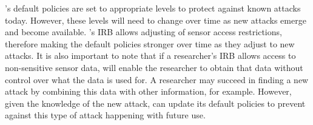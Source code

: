 \sysname's default policies are set to appropriate levels to protect against 
known attacks today. %
However, these levels will need to change over time as
new attacks emerge and become available. \sysname's IRB allows adjusting 
of sensor access restrictions, therefore making the default policies
stronger over time as they adjust to new attacks. It is also important to note that 
if a researcher's IRB allows access to non-sensitive sensor data, \sysname will 
enable the researcher to obtain that data without control over what the data is used for.
A researcher may succeed in finding a new attack by combining this data with other 
information, for example. However, given the 
knowledge of the new attack, \sysname can update its default policies to prevent against
this type of attack happening with future use. 
%
%
%


